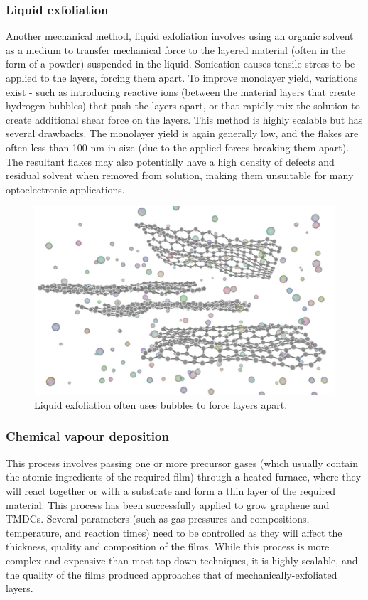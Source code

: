 \documentclass[12pt,a4paper]{report}
\begin{document}
\begin{itemize}
\subsubsection{Liquid exfoliation}
Another mechanical method, liquid exfoliation involves using an organic solvent as a medium to transfer mechanical force to the layered material (often in the form of a powder) suspended in the liquid. Sonication causes tensile stress to be applied to the layers, forcing them apart. To improve monolayer yield, variations exist - such as introducing reactive ions (between the material layers that create hydrogen bubbles) that push the layers apart, or that rapidly mix the solution to create additional shear force on the layers.
This method is highly scalable but has several drawbacks. The monolayer yield is again generally low, and the flakes are often less than 100 nm in size (due to the applied forces breaking them apart). The resultant flakes may also potentially have a high density of defects and residual solvent when removed from solution, making them unsuitable for many optoelectronic applications.
\begin{figure}
  \centering
  \includegraphics[scale=0.3]{2.1.2.png}
  \caption{Liquid exfoliation often uses bubbles to force layers apart.}
  \label{liqexfol}
  \end{figure}

\subsubsection{Chemical vapour deposition}
This process involves passing one or more precursor gases (which usually contain the atomic ingredients of the required film) through a heated furnace, where they will react together or with a substrate and form a thin layer of the required material. This process has been successfully applied to grow graphene and TMDCs. Several parameters (such as gas pressures and compositions, temperature, and reaction times) need to be controlled as they will affect the thickness, quality and composition of the films. While this process is more complex and expensive than most top-down techniques, it is highly scalable, and the quality of the films produced approaches that of mechanically-exfoliated layers.


\end{itemize}
\end{document}
